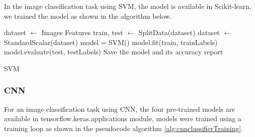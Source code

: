 \documentclass[12pt]{diazessay}
\begin{document}
    \hspace{0.7cm} In the image classification task using SVM, the model is available in Scikit-learn, we trained the model as shown in the algorithm below. \\

    \begin{algorithm}[H]
    \DontPrintSemicolon
    
    
    
        dataset $\gets$ Images Features \;
        train, test $\gets$ SplitData(dataset) \;
        dataset $\gets$ StandardScalar(dataset)\;
        model = SVM()\;
        model.fit(train, trainLabels)\;
        model.evaluate(test, testLabels)  \;
        Save the model and its accuracy report \;
    
    \caption{SVM}
    \label{alg:svmclassifierTraining}
    \end{algorithm}


    \subsubsection{CNN}

    \hspace{0.7cm} For an image classification task using CNN, the four pre-trained models are available in tensorflow.keras.applications module, models were trained using a training loop as shown in the pseudocode algorithm \ref{alg:cnnclassifierTraining}.

    
\end{document}
